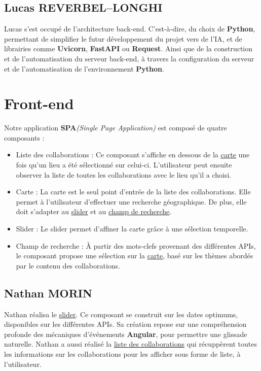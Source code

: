 \documentclass[12pt]{article}
\begin{document}
\subsection{Lucas REVERBEL--LONGHI}
\par Lucas s'est occupé de l'architecture back-end. C'est-à-dire, du choix de \textbf{Python}, permettant de simplifier le futur développement du projet vers de l'IA, et de librairies comme \textbf{Uvicorn}, \textbf{FastAPI} ou \textbf{Request}. Ainsi que de la construction et de l'automatisation du serveur back-end, à travers la configuration du serveur et de l'automatisation de l'environnement \textbf{Python}. 

\section{Front-end}
\label{sec:frontend}

\par Notre application \textbf{SPA}\textit{(Single Page Application)} est composé de quatre composants :
\begin{itemize}
    \item {\large Liste des collaborations}\label{item:liste} : Ce composant s'affiche en dessous de la \underline{\hyperref[item:carte]{carte}} une fois qu'un lieu a été sélectionné sur celui-ci. L'utilisateur peut ensuite observer la liste de toutes les collaborations avec le lieu qu'il a choisi. 
    \item {\large Carte}\label{item:carte} : La carte est le seul point d'entrée de la liste des collaborations. Elle permet à l'utilisateur d'effectuer une recherche géographique. De plus, elle doit s'adapter au \underline{\hyperref[item:slider]{slider}} et au \underline{\hyperref[item:champ]{champ de recherche}}.
    \item {\large Slider}\label{item:slider} : Le slider permet d'affiner la carte grâce à une sélection temporelle.
    \item {\large Champ de recherche}\label{item:champ} : À partir des mots-clefs provenant des différentes APIs, le composant propose une sélection sur la \underline{\hyperref[item:carte]{carte}}, basé sur les thèmes abordés par le contenu des collaborations.
\end{itemize}

\subsection{Nathan MORIN}
Nathan réalisa le \underline{\hyperref[item:slider]{slider}}. Ce composant se construit sur les dates optimums, disponibles sur les différentes APIs. Sa création repose sur une compréhension profonde des mécaniques d'événements \textbf{Angular}, pour permettre une glissade naturelle.
Nathan a aussi réalisé la \underline{\hyperref[item:liste]{liste des collaborations}} qui récuppèrent toutes les informations sur les collaborations pour les afficher sous forme de liste, à l'utilisateur.
\end{document}
